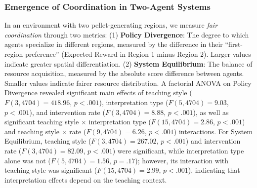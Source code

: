 \documentclass[10pt,letterpaper]{article}
\begin{document}
\subsubsection{Emergence of Coordination in Two-Agent Systems}

In an environment with two pellet-generating regions, we measure \textit{fair coordination} through two metrics: (1) \textbf{Policy Divergence}: The degree to which agents specialize in different regions, measured by the difference in their ``first-region preference'' (Expected Reward in Region 1 minus Region 2). Larger values indicate greater spatial differentiation. (2) \textbf{System Equilibrium}: The balance of resource acquisition, measured by the absolute score difference between agents. Smaller values indicate fairer resource distribution.                                                                                                                                                                                                                                  
 A factorial ANOVA on Policy Divergence revealed significant main effects of teaching style ($F(3, 4704) = 418.96$, $p < .001$), interpretation type ($F(5,4704) = 9.03$, $p < .001$), and intervention rate ($F(3, 4704) = 8.88$, $p < .001$), as well as significant teaching style $\times$ interpretation type ($F(15, 4704) = 2.86$, $p < .001$) and teaching style $\times$ rate ($F(9, 4704) = 6.26$, $p < .001$) interactions. For System Equilibrium, teaching style ($F(3, 4704) = 267.02$, $p < .001$) and intervention rate ($F(3, 4704) = 82.09$, $p < .001$) were significant, while interpretation type alone was not ($F(5, 4704) = 1.56$, $p = .17$); however, its interaction with teaching style was significant ($F(15, 4704) = 2.99$, $p < .001$), indicating that interpretation effects depend on the teaching context.                                                                                                                                                                                                                                                           
\end{document}
